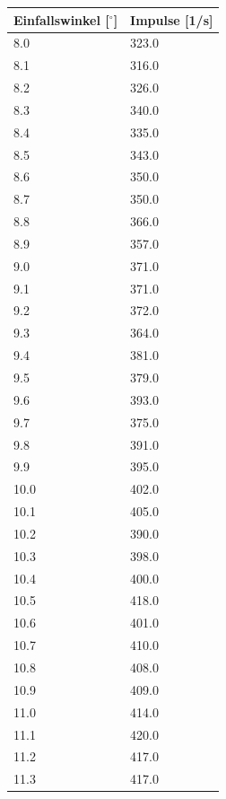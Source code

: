\begin{minipage}{\linewidth}
    \begin{table}[H]
        \centering
    \begin{tabular}{ll}
        \toprule
        Einfallswinkel [$^\circ$] & Impulse [1/s]  \\
        \midrule
        8.0	&	    323.0 \\
        8.1	&	    316.0 \\
        8.2	&	    326.0 \\
        8.3	&	    340.0 \\
        8.4	&	    335.0 \\
        8.5	&	    343.0 \\
        8.6	&	    350.0 \\
        8.7	&	    350.0 \\
        8.8	&	    366.0 \\
        8.9	&	    357.0 \\
        9.0	&	    371.0 \\
        9.1	&	    371.0 \\
        9.2	&	    372.0 \\
        9.3	&	    364.0 \\
        9.4	&	    381.0 \\
        9.5	&	    379.0 \\
        9.6	&	    393.0 \\
        9.7	&	    375.0 \\
        9.8	&	    391.0 \\
        9.9	&	    395.0 \\
        10.0&		402.0 \\
        10.1&		405.0 \\
        10.2&		390.0 \\
        10.3&		398.0 \\
        10.4&		400.0 \\
        10.5&		418.0 \\
        10.6&		401.0 \\
        10.7&		410.0 \\
        10.8&		408.0 \\
        10.9&		409.0 \\
        11.0&		414.0 \\
        11.1&		420.0 \\
        11.2&		417.0 \\
        11.3&		417.0 \\

\end{tabular}
\end{table}
\end{minipage}
